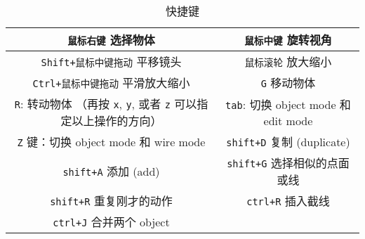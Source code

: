 
\begin{table}[ht]
\centering
\caption{快捷键}\label{Blendr_tab1}
\begin{tabular}{|c|c|}
\hline
\verb|鼠标右键| 选择物体 & \verb|鼠标中键| 旋转视角 \\
\hline
\verb|Shift+鼠标中键拖动| 平移镜头 & \verb|鼠标滚轮| 放大缩小 \\
\hline
\verb|Ctrl+鼠标中键拖动| 平滑放大缩小 & \verb|G| 移动物体 \\
\hline
\verb|R|: 转动物体 （再按 \verb|x|, \verb|y|, 或者 \verb|z| 可以指定以上操作的方向） & \verb|tab|: 切换 object mode 和 edit mode \\
\hline
\verb|Z| 键：切换 object mode 和 wire mode & \verb|shift+D| 复制 (duplicate) \\
\hline
\verb|shift+A| 添加 (add) & \verb|shift+G| 选择相似的点面或线 \\
\hline
\verb|shift+R| 重复刚才的动作 & \verb|ctrl+R| 插入截线 \\
\hline
\verb|ctrl+J| 合并两个 object & \\
\hline
\end{tabular}
\end{table}
